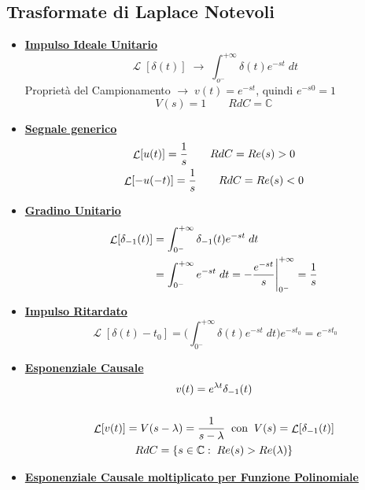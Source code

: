 \documentclass{article}
\newcommand{\Laplace}{\mathop{\mathcal{L}}}
\begin{document}
		\subsection{Trasformate di Laplace Notevoli}
			\begin{itemize}
				\item \underline{\textbf{Impulso Ideale Unitario}} \\
					  \[
					  	\Laplace[\delta(t)]\; \rightarrow\; \int_{o^-}^{+\infty} {\delta(t) e^{-st}\; dt}
					  \]
					  Proprietà del Campionamento $ \rightarrow\; v(t) = e^{-st} $, quindi $ e^{-s0} = 1 $
					  \[
					  	V(s) = 1\quad\quad RdC = \mathbb{C}
					  \]
				\item \underline{\textbf{Segnale generico}} \\
					  \[
					  	\begin{gathered}
							\Laplace[u(t)] = {1\over{s}}\quad\quad RdC = Re(s) > 0 \\
					  		\Laplace[-u(-t)] = {1\over{s}}\quad\quad RdC = Re(s) < 0
					  	\end{gathered}
					  \]
				\item \underline{\textbf{Gradino Unitario}} \\
					  \[
					  	\begin{aligned}
							\Laplace[\delta_{-1}(t)] &= \int_{0^-}^{+\infty} {\delta_{-1}(t) e^{-st}\; dt} \\
					  		&= \int_{0^-}^{+\infty} {e^{-st}\; dt} = -{{e^{-st}}\over{s}} \Bigg\vert_{0^-}^{+\infty} = {1\over{s}}
					  	\end{aligned}
					  \]
				\item \underline{\textbf{Impulso Ritardato}} \\
					  \[
					  	\Laplace[\delta(t) - t_0] = \Big( \int_{0^-}^{+\infty} {\delta(t) e^{-st}\; dt} \Big) e^{-st_0} = e^{-st_0}
					  \]
				\item \underline{\textbf{Esponenziale Causale}} \\
					  \[
					  	\begin{gathered}
							v(t) = e^{\lambda t}\delta_{-1}(t) \\
							\\
					  		\Laplace[v(t)] = V(s - \lambda) = {1\over{s-\lambda}}\;\; \text{con}\;\; V(s) = \Laplace[\delta_{-1}(t)] \\
							RdC = \{ s \in \mathbb{C}:\; Re(s) > Re(\lambda) \}
					  	\end{gathered}
					  \]
				\item \underline{\textbf{Esponenziale Causale moltiplicato per Funzione Polinomiale}} \\

\end{itemize}
\end{document}
